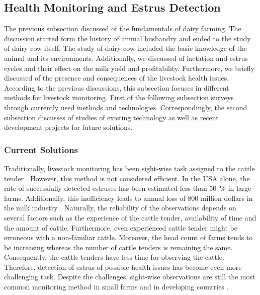 \documentclass[english,12pt,a4paper,pdftex,elec,utf8]{aaltothesis}
\begin{document}
\subsection{Health Monitoring and Estrus Detection} \label{healthmonitoringandestrusdetectionsection}

The previous subsection discussed of the fundamentals of dairy farming. The discussion started form the history of animal husbandry and ended to the study of dairy cow itself. The study of dairy cow included the basic knowledge of the animal and its environments. Additionally, we discussed of lactation and estrus cycles and their effect on the milk yield and profitability. Furthermore, we briefly discussed of the presence and consequences of the livestock health issues. According to the previous discussions, this subsection focuses in different methods for livestock monitoring. First of the following subsection surveys through currently used methods and technologies. Correspondingly, the second subsection discusses of studies of existing technology as well as recent development projects for future solutions.  

\subsubsection{Current Solutions} \label{currentsolutionssection}

Traditionally, livestock monitoring has been sight-wise task assigned to the cattle tender \cite{lehmahavaintoja}. However, this method is not considered efficient. In the USA alone, the rate of successfully detected estruses has been estimated less than \SI{50}{\percent} in large farms. Additionally, this inefficiency leads to annual loss of 800 million dollars in the milk industry \cite{BRUNASSI2010}. Naturally, the reliability of the observations depends on several factors such as the experience of the cattle tender, availability of time and the amount of cattle. Furthermore, even experienced cattle tender might be erroneous with a non-familiar cattle. Moreover, the head count of farms tends to be increasing whereas the number of cattle tenders is remaining the same. Consequently, the cattle tenders have less time for observing the cattle. Therefore, detection of estrus of possible health issues has become even more challenging task. Despite the challenges, sight-wise observations are still the most common monitoring method in small farms and in developing countries \cite{BRUNASSI2010}. 
\end{document}
